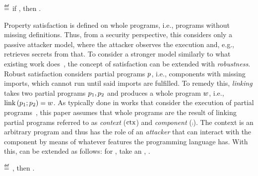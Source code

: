 \documentclass[utf8,acmsmall,review,screen,dvipsnames,anonymous]{acmart}
\begin{document}
\begin{definition}\label{def:propsat}
  \bul{$\sat{\progvar}{\pi}$}
  $\isdef$
  if \iul{$\progstepto{\wholeprogvar}{\runtimetermvar}{\trace}$},
  then \oul{$\trace\in\pi$}.
\end{definition}

Property satisfaction is defined on whole programs, i.e., programs without missing definitions.
Thus, from a security perspective, this considers only a passive attacker model, where the attacker observes the execution and, e.g., retrieves secrets from that.
To consider a stronger model similarly to what existing work does~\cite{abate2019jour,abate2021extacc,patrignani2021rsc,maffeis2008code-carrying,gordon2003authenticity,fournet2007authorization,bengtson2011refine,backes2014uniontyps}, the concept of satisfaction can be extended with {\em robustness}.
Robust satisfaction considers partial programs $\progvar$, i.e., components with missing imports, which cannot run until said imports are fulfilled.
To remedy this, {\em linking} takes two partial programs $\progvar[_{1}],\progvar[_{2}]$ and produces a whole program $\wholeprogvar$, i.e., $\link{\progvar[_{1}]}{\progvar[_{2}]}=\wholeprogvar$.
As typically done in works that consider the execution of partial programs~\cite{abate2019jour,devriese2018parametricity,patrignani2021rsc,korashy2021capableptrs,strydonck2019lincap,devriese2017modular,bowman2015noninterference,ahmed2011equivcps,patterson2017linkingtyps},
this paper assumes that whole programs are the result of linking partial programs referred to as {\em context} ($\ctx$) and {\em component} ($\comp$).
The context is an arbitrary program and thus has the role of an {\em attacker} that can interact with the component by means of whatever features the programming language has.
With this,  can be extended as follows: for , take an , .

\begin{definition}\label{def:proprsat}
  \bul{$\rsat{\progvar}{\pi}$}
  $\isdef$ , then \oul{$\sat{\wholeprogvar}{\pi}$}.
\end{definition}
\end{document}
